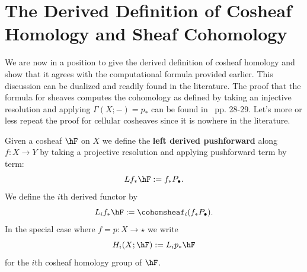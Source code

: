 \section{The Derived Definition of Cosheaf Homology and Sheaf Cohomology}
\label{subsec:derived_sheaf_cohom}

We are now in a position to give the derived definition of cosheaf homology and show that it agrees with the computational formula provided earlier. This discussion can be dualized and readily found in the literature. The proof that the formula for sheaves computes the cohomology as defined by taking an injective resolution and applying $\Gamma(X;-)=p_*$ can be found in~\cite{shepard} pp. 28-29. Let's more or less repeat the proof for cellular cosheaves since it is nowhere in the literature.

\begin{defn}
	Given a cosheaf $\hF$ on $X$ we define the \textbf{left derived pushforward} along $f:X\to Y$ by taking a projective resolution and applying pushforward term by term:
	\[
		Lf_*\hF:=f_*P_{\bullet}.
	\]
	We define the $i$th derived functor by
	\[
		L_if_*\hF:= \cohomsheaf_i(f_*P_{\bullet}).
	\]
	In the special case where $f=p:X\to\star$ we write
	\[
		H_i(X;\hF):=L_ip_*\hF
	\]
	for the $i$th cosheaf homology group of $\hF$.
\end{defn}

